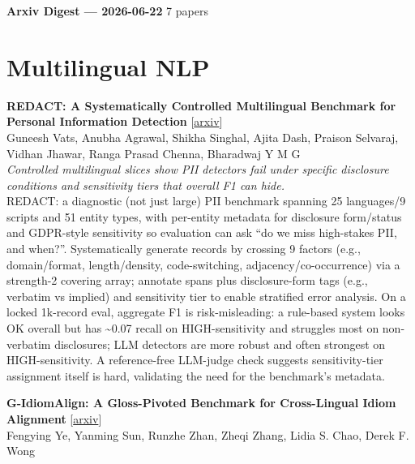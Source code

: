 \documentclass[12pt,letterpaper]{article}
\begin{document}
{\footnotesize\textbf{Arxiv Digest --- 2026-06-22} \hfill 7 papers}

\smallskip

\section*{Multilingual NLP}

{\small\textbf{REDACT: A Systematically Controlled Multilingual Benchmark for Personal Information Detection}} {\scriptsize[\href{https://arxiv.org/abs/2606.19881}{arxiv}]}\\
{\scriptsize Guneesh Vats, Anubha Agrawal, Shikha Singhal, Ajita Dash, Praison Selvaraj, Vidhan Jhawar, Ranga Prasad Chenna, Bharadwaj Y M G}\\

{\small\textit{Controlled multilingual slices show PII detectors fail under specific disclosure conditions and sensitivity tiers that overall F1 can hide.}}\\[1pt]
{\footnotesize REDACT: a diagnostic (not just large) PII benchmark spanning 25 languages/9 scripts and 51 entity types, with per-entity metadata for disclosure form/status and GDPR-style sensitivity so evaluation can ask ``do we miss high-stakes PII, and when?''. Systematically generate records by crossing 9 factors (e.g., domain/format, length/density, code-switching, adjacency/co-occurrence) via a strength-2 covering array; annotate spans plus disclosure-form tags (e.g., verbatim vs implied) and sensitivity tier to enable stratified error analysis. On a locked 1k-record eval, aggregate F1 is risk-misleading: a rule-based system looks OK overall but has \textasciitilde{}0.07 recall on HIGH-sensitivity and struggles most on non-verbatim disclosures; LLM detectors are more robust and often strongest on HIGH-sensitivity. A reference-free LLM-judge check suggests sensitivity-tier assignment itself is hard, validating the need for the benchmark's metadata.}

\medskip

{\small\textbf{G-IdiomAlign: A Gloss-Pivoted Benchmark for Cross-Lingual Idiom Alignment}} {\scriptsize[\href{https://arxiv.org/abs/2606.18989}{arxiv}]}\\
{\scriptsize Fengying Ye, Yanming Sun, Runzhe Zhan, Zheqi Zhang, Lidia S. Chao, Derek F. Wong}\\
\end{document}

